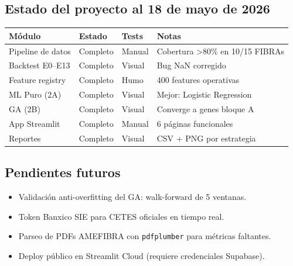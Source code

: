 \documentclass[12pt, a4paper]{article}
\begin{document}
\subsection{Estado del proyecto al 18 de mayo de 2026}

\begin{center}
\begin{tabular}{llll}
  \toprule
  \textbf{M\'{o}dulo} & \textbf{Estado} & \textbf{Tests} & \textbf{Notas} \\
  \midrule
  Pipeline de datos     & Completo & Manual & Cobertura >80\% en 10/15 FIBRAs \\
  Backtest E0--E13      & Completo & Visual & Bug NaN corregido \\
  Feature registry      & Completo & Humo   & 400 features operativas \\
  ML Puro (2A)          & Completo & Visual & Mejor: Logistic Regression \\
  GA (2B)               & Completo & Visual & Converge a genes bloque A \\
  App Streamlit         & Completo & Manual & 6 p\'{a}ginas funcionales \\
  Reportes              & Completo & Visual & CSV + PNG por estrategia \\
  \bottomrule
\end{tabular}
\end{center}

\subsection{Pendientes futuros}
\begin{itemize}
  \item[$\square$] Validaci\'{o}n anti-overfitting del GA: walk-forward de 5 ventanas.
  \item[$\square$] Token Banxico SIE para CETES oficiales en tiempo real.
  \item[$\square$] Parseo de PDFs AMEFIBRA con \texttt{pdfplumber} para m\'{e}tricas faltantes.
  \item[$\square$] Deploy p\'{u}blico en Streamlit Cloud (requiere credenciales Supabase).
\end{itemize}
\end{document}
